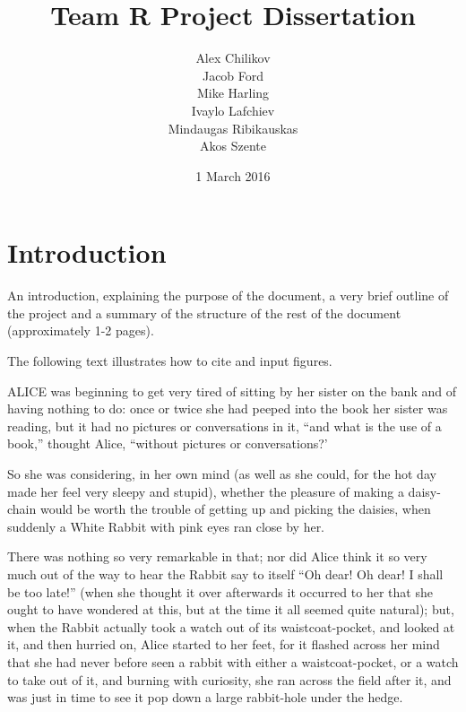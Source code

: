 \documentclass{l3proj}
\begin{document}
\title{Team R Project Dissertation}
\author{Alex Chilikov \\
        Jacob Ford \\
        Mike Harling \\
        Ivaylo Lafchiev \\
        Mindaugas Ribikauskas \\
        Akos Szente}
\date{1 March 2016}
\maketitle
\educationalconsent
\tableofcontents
\chapter{Introduction}
\label{intro}

An introduction, explaining the purpose of the document, a very brief outline of the project and a summary of the structure of the rest of the document (approximately 1-2 pages).

The following text illustrates how to cite and input figures.

ALICE \cite{alice} was beginning to get very tired of sitting by her sister
on the bank and of having nothing to do: once or twice she had peeped into
the book her sister was reading, but it had no pictures or conversations in
it, ``and what is the use of a book,'' thought Alice, ``without pictures or
conversations?'

So she was considering, in her own mind (as well as she could, for the hot
day made her feel very sleepy and stupid), whether the pleasure of making a
daisy-chain would be worth the trouble of getting up and picking the
daisies, when suddenly a White Rabbit with pink eyes ran close by her.

There was nothing so very remarkable in that; nor did Alice think it so
very much out of the way to hear the Rabbit say to itself ``Oh dear! Oh
dear! I shall be too late!'' (when she thought it over afterwards it
occurred to her that she ought to have wondered at this, but at the time it
all seemed quite natural); but, when the Rabbit actually took a watch out
of its waistcoat-pocket, and looked at it, and then hurried on, Alice
started to her feet, for it flashed across her mind that she had never
before seen a rabbit with either a waistcoat-pocket, or a watch to take out
of it, and burning with curiosity, she ran across the field after it, and
was just in time to see it pop down a large rabbit-hole under the hedge.
\end{document}
